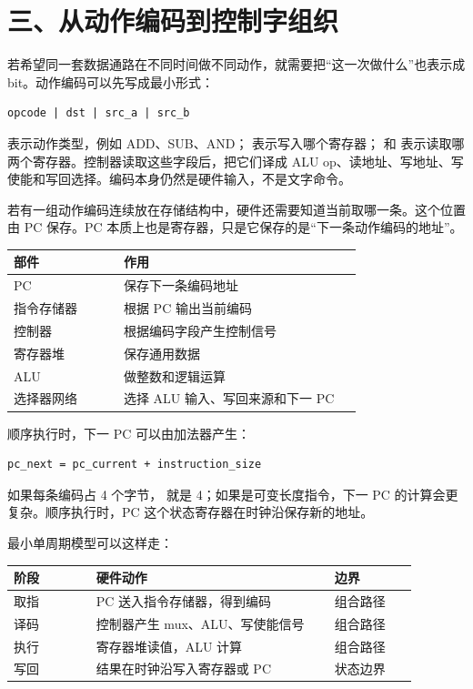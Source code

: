 \section{三、从动作编码到控制字组织}

若希望同一套数据通路在不同时间做不同动作，就需要把“这一次做什么”也表示成 bit。动作编码可以先写成最小形式：

\begin{lstlisting}
opcode | dst | src_a | src_b
\end{lstlisting}

 表示动作类型，例如 ADD、SUB、AND； 表示写入哪个寄存器； 和  表示读取哪两个寄存器。控制器读取这些字段后，把它们译成 ALU op、读地址、写地址、写使能和写回选择。编码本身仍然是硬件输入，不是文字命令。

若有一组动作编码连续放在存储结构中，硬件还需要知道当前取哪一条。这个位置由 PC 保存。PC 本质上也是寄存器，只是它保存的是“下一条动作编码的地址”。

\begin{longtable}{L{0.24\linewidth}L{0.52\linewidth}}
\toprule
部件 & 作用 \\
\midrule
PC & 保存下一条编码地址 \\\tablerowrule
指令存储器 & 根据 PC 输出当前编码 \\\tablerowrule
控制器 & 根据编码字段产生控制信号 \\\tablerowrule
寄存器堆 & 保存通用数据 \\\tablerowrule
ALU & 做整数和逻辑运算 \\\tablerowrule
选择器网络 & 选择 ALU 输入、写回来源和下一 PC \\
\bottomrule
\end{longtable}

顺序执行时，下一 PC 可以由加法器产生：

\begin{lstlisting}
pc_next = pc_current + instruction_size
\end{lstlisting}

如果每条编码占 4 个字节， 就是 4；如果是可变长度指令，下一 PC 的计算会更复杂。顺序执行时，PC 这个状态寄存器在时钟沿保存新的地址。

最小单周期模型可以这样走：

\begin{longtable}{L{0.18\linewidth}L{0.52\linewidth}L{0.18\linewidth}}
\toprule
阶段 & 硬件动作 & 边界 \\
\midrule
取指 & PC 送入指令存储器，得到编码 & 组合路径 \\\tablerowrule
译码 & 控制器产生 mux、ALU、写使能信号 & 组合路径 \\\tablerowrule
执行 & 寄存器堆读值，ALU 计算 & 组合路径 \\\tablerowrule
写回 & 结果在时钟沿写入寄存器或 PC & 状态边界 \\
\bottomrule
\end{longtable}

